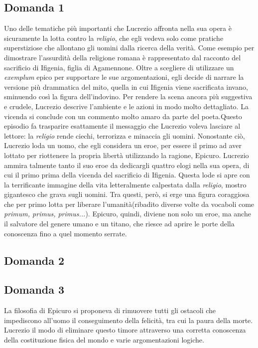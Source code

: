 \documentclass[10pt,a4paper]{article}
\begin{document}
	\subsection{Domanda 1}
	
	Uno delle tematiche più importanti che Lucrezio affronta nella sua opera è sicuramente la lotta contro la \textit{religio}, che egli vedeva solo come pratiche superstiziose che allontano gli uomini dalla ricerca della verità. Come esempio per dimostrare l'assurdità della religione romana è rappresentato dal racconto del sacrificio di Ifigenia, figlia di Agamennone. 
	Oltre a scegliere di utilizzare un \textit{exemplum} epico per supportare le sue argomentazioni, egli decide di narrare la versione più drammatica del mito, quella in cui Ifigenia viene sacrificata invano, sminuendo così la figura dell'indovino. Per rendere la scena ancora più suggestiva e crudele, Lucrezio descrive l'ambiente e le azioni in modo molto dettagliato. La vicenda si conclude con un commento molto amaro da parte del poeta.Questo episodio fa trasparire esattamente il messaggio che Lucrezio voleva lasciare al lettore: la \textit{religio} rende ciechi, terrorizza e minaccia gli uomini. Nonostante ciò, Lucrezio loda un uomo, che egli considera un eroe, per essere il primo ad aver lottato per riottenere la propria libertà utilizzando la ragione, Epicuro. Lucrezio ammira talmente tanto il suo eroe da dedicargli quattro elogi nella sua opera, di cui il primo prima della vicenda del sacrificio di Ifigenia. Questa lode si apre con la terrificante immagine della vita letteralmente calpestata dalla \textit{religio}, mostro gigantesco che grava sugli uomini. Tra questi, però, si erge una figura coraggiosa che per primo lotta per liberare l'umanità(ribadito diverse volte da vocaboli come \textit{primum, primus, primus...}). Epicuro, quindi, diviene non solo un eroe, ma anche il salvatore del genere umano e un titano, che riesce ad aprire le porte della conoscenza fino a quel momento serrate.
	
	\subsection{Domanda 2}
	
	\subsection{Domanda 3}
	
	La filosofia di Epicuro si proponeva di rimuovere tutti gli ostacoli che impediscono all'uomo il conseguimento della felicità, tra cui la paura della morte. Lucrezio il modo di eliminare questo timore attraverso una corretta conoscenza della costituzione fisica del mondo e varie argomentazioni logiche.
	
\end{document}
